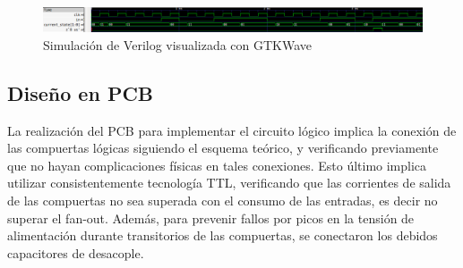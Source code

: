\begin{figure}[H]
    \centering
    \includegraphics[scale=0.4]{../EJ2/Recursos/simulacion.png}    
    \caption{Simulaci\'on de Verilog visualizada con GTKWave}
    \label{fig:ej2_simulacion}
\end{figure}

\subsection{Dise\~no en PCB}
La realizaci\'on del PCB para implementar el circuito l\'ogico implica la conexi\'on de las compuertas l\'ogicas siguiendo
el esquema te\'orico, y verificando previamente que no hayan complicaciones f\'isicas en tales conexiones. Esto \'ultimo implica
utilizar consistentemente tecnolog\'ia TTL, verificando que las corrientes de salida de las compuertas no sea superada con el consumo
de las entradas, es decir no superar el fan-out. Adem\'as, para prevenir fallos por picos en la tensi\'on de alimentaci\'on durante transitorios de las compuertas,
se conectaron los debidos capacitores de desacople.


